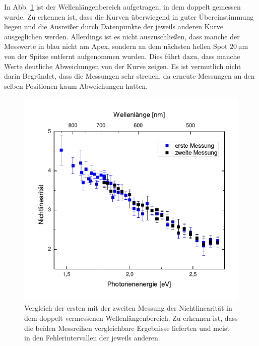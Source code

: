 \documentclass[bachelor,       %
               twoside,        %
               BCOR10mm,       %
               english,ngerman, %
               ]{GAUBM}
\begin{document}
In Abb. \ref{fig:ges_messung} ist der Wellenlängenbereich aufgetragen, in dem doppelt gemessen wurde.
Zu erkennen ist, dass die Kurven überwiegend in guter Übereinstimmung liegen und die Ausreißer durch Datenpunkte der jeweils anderen Kurve ausgeglichen werden.
Allerdings ist es nicht auszuschließen, dass manche der Messwerte in blau nicht am Apex, sondern an dem nächsten hellen Spot $\SI{20}{\micro\meter}$ von der Spitze entfernt aufgenommen wurden.
Dies führt dazu, dass manche Werte deutliche Abweichungen von der Kurve zeigen.
Es ist vermutlich nicht darin Begründet, dass die Messungen sehr streuen, da erneute Messungen an den selben Positionen kaum Abweichungen hatten.
\begin{figure}[h]
	\centering
	\includegraphics{Vergleich}
	\caption{Vergleich der ersten mit der zweiten Messung der Nichtlinearität in dem doppelt vermessenen Wellenlängenbereich. Zu erkennen ist, dass die beiden Messreihen vergleichbare Ergebnisse lieferten und meist in den Fehlerintervallen der jeweils anderen.}
	\label{fig:ges_messung}
\end{figure}
\end{document}
